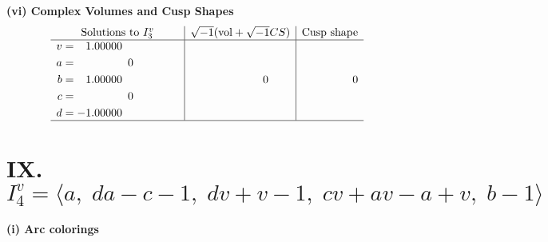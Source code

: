 \documentclass[1p]{elsarticle_modified}
\theoremstyle{definition}
\newcommand{\I}{\sqrt{-1}}
\begin{document}
\newpage\flushleft \textbf{(vi) Complex Volumes and Cusp Shapes}
$$\begin{array}{c|c|c}  
\text{Solutions to }I^v_{3}& \I (\text{vol} + \sqrt{-1}CS) & \text{Cusp shape}\\
 \hline 
\begin{aligned}
v &= \phantom{-}1.00000\phantom{ +0.000000I} \\
a &= \phantom{-0.000000 } 0 \\
b &= \phantom{-}1.00000\phantom{ +0.000000I} \\
c &= \phantom{-0.000000 } 0 \\
d &= -1.00000\phantom{ +0.000000I}\end{aligned}
 & \phantom{-0.000000 } 0 & \phantom{-0.000000 } 0\\
 \hline 
 \end{array}$$\newpage\newpage\renewcommand{\arraystretch}{1}
\centering \section*{IX. $I^v_{4}= \langle a,\;d a- c-1,\;d v+v-1,\;c v+a v- a+v,\;b-1 \rangle$}
\flushleft \textbf{(i) Arc colorings}\\
\end{document}
